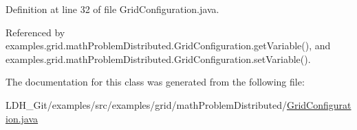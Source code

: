 Definition at line 32 of file Grid\-Configuration.\-java.



Referenced by examples.\-grid.\-math\-Problem\-Distributed.\-Grid\-Configuration.\-get\-Variable(), and examples.\-grid.\-math\-Problem\-Distributed.\-Grid\-Configuration.\-set\-Variable().



The documentation for this class was generated from the following file\-:\begin{DoxyCompactItemize}
\item 
L\-D\-H\-\_\-\-Git/examples/src/examples/grid/math\-Problem\-Distributed/\hyperlink{math_problem_distributed_2_grid_configuration_8java}{Grid\-Configuration.\-java}\end{DoxyCompactItemize}
